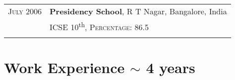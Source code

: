 \documentclass[a4paper,10pt]{article} %
\begin{document}
\begin{tabular}{rl}

\textsc{July} 2006 & \textbf{Presidency School}, R T Nagar, Bangalore, India\\
& \textsc{ICSE 10}\textsuperscript{th}, \normalsize \textsc{Percentage}: 86.5 \\
\fi

\end{tabular}


\section{Work Experience $\sim$ 4 years}
\end{document}
